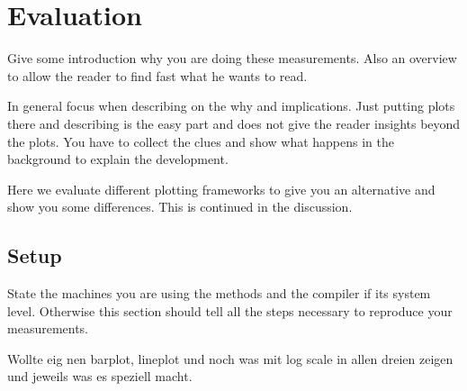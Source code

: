 \chapter{Evaluation}
Give some introduction why you are doing these measurements.
Also an overview to allow the reader to find fast what he wants to read.

In general focus when describing on the why and implications.
Just putting plots there and describing is the easy part and does not give the reader insights beyond the plots.
You have to collect the clues and show what happens in the background to explain the development.

Here we evaluate different plotting frameworks to give you an alternative and show you some differences. This is continued in the discussion.

\section{Setup}
State the machines you are using the methods and the compiler if its system level.
Otherwise this section should tell all the steps necessary to reproduce your measurements.

Wollte eig nen barplot, lineplot und noch was mit log scale in allen dreien zeigen und jeweils was es speziell macht.

\section{}
